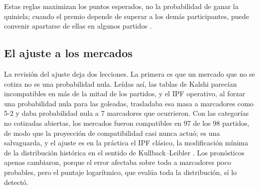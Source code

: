 \documentclass[12pt]{article}
\theoremstyle{plain}
\theoremstyle{remark}
\begin{document}
\begin{center}
\end{center}

\noindent
Estas reglas maximizan los puntos esperados, no la probabilidad de
ganar la quiniela; cuando el premio depende de superar a los demás
participantes, puede convenir apartarse de ellas en algunos partidos
\citep{clair2007}.

\subsection{El ajuste a los mercados}

La revisión del ajuste deja dos lecciones.
La primera es que un mercado que no se cotiza no es una probabilidad
nula.
Leídas así, las tablas de Kalshi parecían incompatibles en más de la
mitad de los partidos, y el IPF operativo, al forzar una probabilidad
nula para las goleadas, trasladaba esa masa a marcadores como 5-2 y
daba probabilidad nula a 7 marcadores que ocurrieron.
Con las categorías no cotizadas abiertas, los mercados fueron
compatibles en 97 de los 98 partidos, de modo que la proyección
de compatibilidad casi nunca actuó; es una salvaguarda, y el ajuste
es en la práctica el IPF clásico, la modificación mínima de la
distribución histórica en el sentido de Kullback--Leibler
\citep{csiszar1975}.
Los pronósticos apenas cambiaron, porque el error afectaba sobre todo
a marcadores poco probables, pero el puntaje logarítmico, que evalúa
toda la distribución, sí lo detectó.
\end{document}
